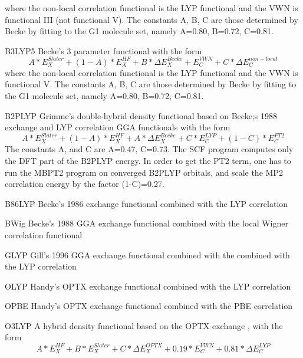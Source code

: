 \begin{keywordlist}
\begin{equation}
\end{equation}
where the non-local correlation functional is the LYP functional and the VWN is functional III (not functional V).
The constants A, B, C are those determined by Becke by fitting to the G1 molecule set, namely
A=0.80, B=0.72, C=0.81.
\item[B3LYP5]
Becke's 3 parameter functional \cite{Becke:93} with the form
\begin{equation}
A*E_X ^{Slater} + (1-A)*E_X ^{HF} + B*\Delta E_X ^{Becke} + E_C ^{VWN} + C*\Delta E_C ^{non-local}
\end{equation}
where the non-local correlation functional is the LYP functional and the VWN is functional V.
The constants A, B, C are those determined by Becke by fitting to the G1 molecule set, namely
A=0.80, B=0.72, C=0.81.
\item[B2PLYP]
Grimme's double-hybrid density functional \cite{B2PLYP} based on Becke;s 1988 exchange and LYP correlation GGA functionals  with the form
\begin{equation}
A*E_X ^{Slater} + (1-A)*E_X ^{HF} + A*\Delta E_X ^{Becke} + C*E_C ^{LYP} + (1-C)*E_C ^{PT2}
\end{equation}
The constants A, and  C are A=0.47, C=0.73. The SCF program computes only the DFT part of the B2PLYP energy.
In order to get the PT2 term, one has to run the MBPT2 program on converged B2PLYP orbitals, and scale the MP2
correlation energy by the factor (1-C)=0.27.
\item[B86LYP]
Becke's 1986 exchange \cite{B86,B07} functional combined with the LYP correlation \cite{Lee:88,Miehlich:89}
\item[BWig]
Becke's 1988 GGA exchange functional combined with the local Wigner correlation functional \cite{GillWig}
\item[GLYP]
Gill's 1996 GGA exchange functional \cite{G96} combined with the  combined with the LYP correlation \cite{Lee:88,Miehlich:89}
\item[OLYP]
Handy's OPTX exchange functional \cite{OPTX} combined with the LYP correlation \cite{Lee:88,Miehlich:89}
\item[OPBE]
Handy's OPTX exchange functional \cite{OPTX} combined with the PBE correlation\cite{PBE:96}
\item[O3LYP]
A hybrid density functional based on the OPTX exchange \cite{O3LYP} , with the form
\begin{equation}
  A*E_X ^{HF} +B*E_X ^{Slater}  + C*\Delta E_X ^{OPTX} + 0.19*E_C ^{VWN} + 0.81*\Delta E_C ^{LYP}
\end{equation}

\end{keywordlist}
